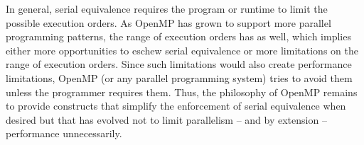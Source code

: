 In general, serial equivalence requires the program or runtime to limit
the possible execution orders. As OpenMP has grown to support more parallel 
programming patterns, the range of execution orders has as well, which 
implies either more opportunities to eschew serial equivalence or more
limitations on the range of execution orders. Since such limitations would 
also create performance limitations, OpenMP (or any parallel programming 
system) tries to avoid them unless the programmer requires them. Thus, the 
philosophy of OpenMP remains to provide constructs that simplify the 
enforcement of serial equivalence when desired but that has evolved not 
to limit parallelism -- and by extension -- performance unnecessarily.

